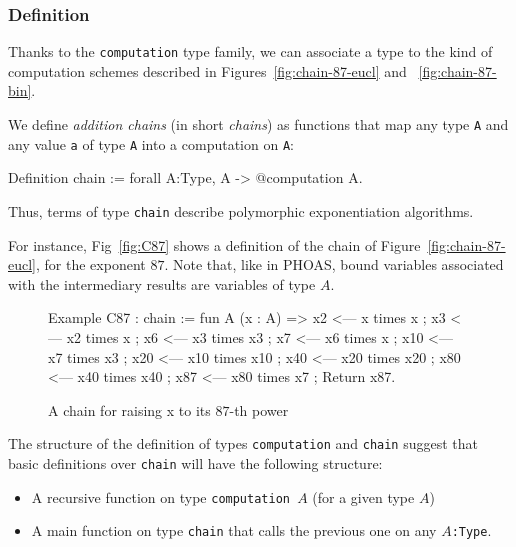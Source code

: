 \subsubsection{Definition}
\label{chain-def}

Thanks to the  \texttt{computation} type family, we can associate a type
to the kind of computation schemes described in Figures~\ref{fig:chain-87-eucl} and ~\ref{fig:chain-87-bin}.

We define 
 \emph{addition chains} (in short  \emph{chains}) as functions that map
 any
 type \texttt{A} and any value \texttt{a} of type \texttt{A}  into a computation 
on \texttt{A}:


\begin{Coqsrc}
Definition chain := forall A:Type, A -> @computation A.   
\end{Coqsrc}

Thus, terms of type \texttt{chain} describe polymorphic 
exponentiation algorithms. 


For instance, Fig~\vref{fig:C87} shows a definition of the chain  of Figure~\ref{fig:chain-87-eucl}, for the exponent $87$.
Note that, like in PHOAS, bound variables associated with the 
intermediary results are \coq{} variables of type $A$.
\begin{figure}[h]
  \centering
  \begin{Coqsrc}
Example  C87 : chain :=
 fun A (x : A) =>
  x2 <--- x times x ;
  x3 <--- x2 times x ;
  x6 <--- x3 times x3 ;
  x7 <--- x6 times x ;
  x10 <--- x7 times x3 ;
  x20 <--- x10 times x10 ;
  x40 <--- x20 times x20 ;
  x80 <--- x40 times x40 ;  
  x87 <--- x80 times x7 ;
  Return x87.
 \end{Coqsrc}
  \caption{A chain for raising x to its $87$-th power}
  \label{fig:C87}
\end{figure}



The structure of the definition of types \texttt{computation}   and \texttt{chain} suggest that basic definitions over \texttt{chain} will have the following structure:
\begin{itemize}
\item A recursive function on type \texttt{computation $A$} (for a given
    type $A$)
\item A main function on type \texttt{chain} that calls the previous one on 
any \texttt{$A$:Type}.
\end{itemize}

